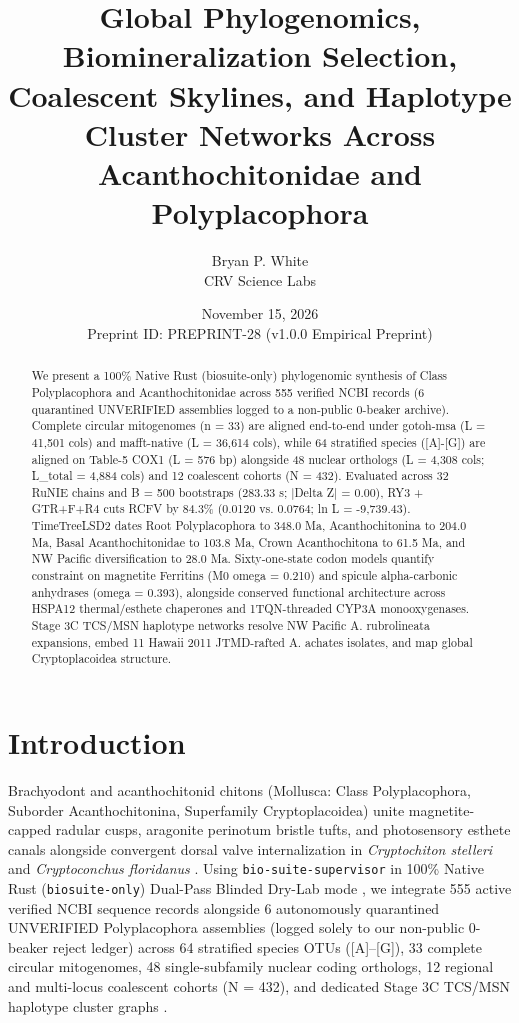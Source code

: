 \documentclass[11pt]{article}
\title{Global Phylogenomics, Biomineralization Selection, Coalescent Skylines, and Haplotype Cluster Networks Across Acanthochitonidae and Polyplacophora}
\author{Bryan P. White \\ CRV Science Labs}
\date{November 15, 2026 \\ \small Preprint ID: PREPRINT-28 (v1.0.0 Empirical Preprint)}
\begin{document}
\maketitle
\begin{abstract}
We present a 100\% Native Rust (biosuite-only) phylogenomic synthesis of Class Polyplacophora and Acanthochitonidae across 555 verified NCBI records (6 quarantined UNVERIFIED assemblies logged to a non-public 0-beaker archive). Complete circular mitogenomes (n = 33) are aligned end-to-end under gotoh-msa (L = 41,501 cols) and mafft-native (L = 36,614 cols), while 64 stratified species ([A]-[G]) are aligned on Table-5 COX1 (L = 576 bp) alongside 48 nuclear orthologs (L = 4,308 cols; L\_total = 4,884 cols) and 12 coalescent cohorts (N = 432). Evaluated across 32 RuNIE chains and B = 500 bootstraps (283.33 s; |Delta Z| = 0.00), RY3 + GTR+F+R4 cuts RCFV by 84.3\% (0.0120 vs. 0.0764; ln L = -9,739.43). TimeTreeLSD2 dates Root Polyplacophora to 348.0 Ma, Acanthochitonina to 204.0 Ma, Basal Acanthochitonidae to 103.8 Ma, Crown Acanthochitona to 61.5 Ma, and NW Pacific diversification to 28.0 Ma. Sixty-one-state codon models quantify constraint on magnetite Ferritins (M0 omega = 0.210) and spicule alpha-carbonic anhydrases (omega = 0.393), alongside conserved functional architecture across HSPA12 thermal/esthete chaperones and 1TQN-threaded CYP3A monooxygenases. Stage 3C TCS/MSN haplotype networks resolve NW Pacific A. rubrolineata expansions, embed 11 Hawaii 2011 JTMD-rafted A. achates isolates, and map global Cryptoplacoidea structure.
\end{abstract}

\section{Introduction}
Brachyodont and acanthochitonid chitons (Mollusca: Class Polyplacophora, Suborder Acanthochitonina, Superfamily Cryptoplacoidea) unite magnetite-capped radular cusps, aragonite perinotum bristle tufts, and photosensory esthete canals alongside convergent dorsal valve internalization in \emph{Cryptochiton stelleri} and \emph{Cryptoconchus floridanus} \cite{ref2,ref3,ref4,ref8,ref15,ref16}. Using \texttt{bio-suite-supervisor} in 100\% Native Rust (\texttt{biosuite-only}) Dual-Pass Blinded Dry-Lab mode \cite{ref1}, we integrate 555 active verified NCBI sequence records alongside 6 autonomously quarantined UNVERIFIED Polyplacophora assemblies (logged solely to our non-public 0-beaker reject ledger) across 64 stratified species OTUs ([A]--[G]), 33 complete circular mitogenomes, 48 single-subfamily nuclear coding orthologs, 12 regional and multi-locus coalescent cohorts (N = 432), and dedicated Stage 3C TCS/MSN haplotype cluster graphs \cite{ref12,ref17,ref18,ref19}.
\end{document}
